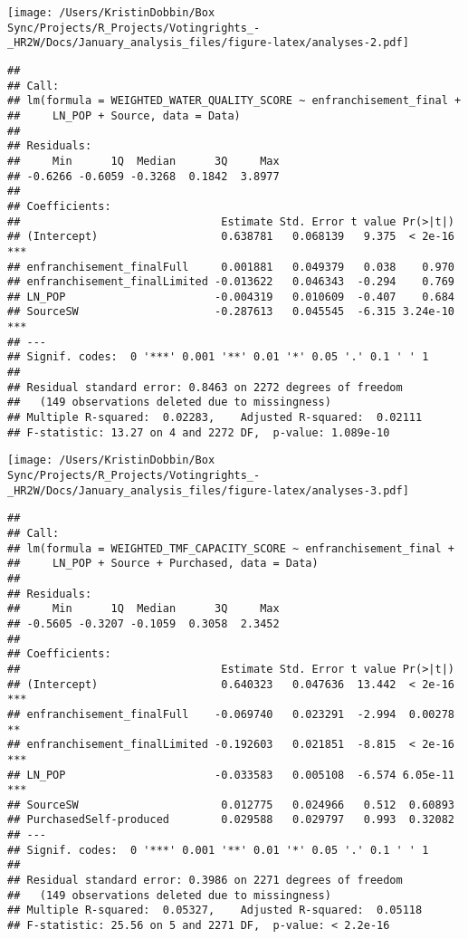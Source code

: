 \documentclass[
]{article}
\begin{document}
\texttt{[image: /Users/KristinDobbin/Box Sync/Projects/R\_Projects/Votingrights\_-\_HR2W/Docs/January\_analysis\_files/figure-latex/analyses-2.pdf]}

\begin{verbatim}
## 
## Call:
## lm(formula = WEIGHTED_WATER_QUALITY_SCORE ~ enfranchisement_final + 
##     LN_POP + Source, data = Data)
## 
## Residuals:
##     Min      1Q  Median      3Q     Max 
## -0.6266 -0.6059 -0.3268  0.1842  3.8977 
## 
## Coefficients:
##                               Estimate Std. Error t value Pr(>|t|)    
## (Intercept)                   0.638781   0.068139   9.375  < 2e-16 ***
## enfranchisement_finalFull     0.001881   0.049379   0.038    0.970    
## enfranchisement_finalLimited -0.013622   0.046343  -0.294    0.769    
## LN_POP                       -0.004319   0.010609  -0.407    0.684    
## SourceSW                     -0.287613   0.045545  -6.315 3.24e-10 ***
## ---
## Signif. codes:  0 '***' 0.001 '**' 0.01 '*' 0.05 '.' 0.1 ' ' 1
## 
## Residual standard error: 0.8463 on 2272 degrees of freedom
##   (149 observations deleted due to missingness)
## Multiple R-squared:  0.02283,    Adjusted R-squared:  0.02111 
## F-statistic: 13.27 on 4 and 2272 DF,  p-value: 1.089e-10
\end{verbatim}

\texttt{[image: /Users/KristinDobbin/Box Sync/Projects/R\_Projects/Votingrights\_-\_HR2W/Docs/January\_analysis\_files/figure-latex/analyses-3.pdf]}

\begin{verbatim}
## 
## Call:
## lm(formula = WEIGHTED_TMF_CAPACITY_SCORE ~ enfranchisement_final + 
##     LN_POP + Source + Purchased, data = Data)
## 
## Residuals:
##     Min      1Q  Median      3Q     Max 
## -0.5605 -0.3207 -0.1059  0.3058  2.3452 
## 
## Coefficients:
##                               Estimate Std. Error t value Pr(>|t|)    
## (Intercept)                   0.640323   0.047636  13.442  < 2e-16 ***
## enfranchisement_finalFull    -0.069740   0.023291  -2.994  0.00278 ** 
## enfranchisement_finalLimited -0.192603   0.021851  -8.815  < 2e-16 ***
## LN_POP                       -0.033583   0.005108  -6.574 6.05e-11 ***
## SourceSW                      0.012775   0.024966   0.512  0.60893    
## PurchasedSelf-produced        0.029588   0.029797   0.993  0.32082    
## ---
## Signif. codes:  0 '***' 0.001 '**' 0.01 '*' 0.05 '.' 0.1 ' ' 1
## 
## Residual standard error: 0.3986 on 2271 degrees of freedom
##   (149 observations deleted due to missingness)
## Multiple R-squared:  0.05327,    Adjusted R-squared:  0.05118 
## F-statistic: 25.56 on 5 and 2271 DF,  p-value: < 2.2e-16
\end{verbatim}
\end{document}
